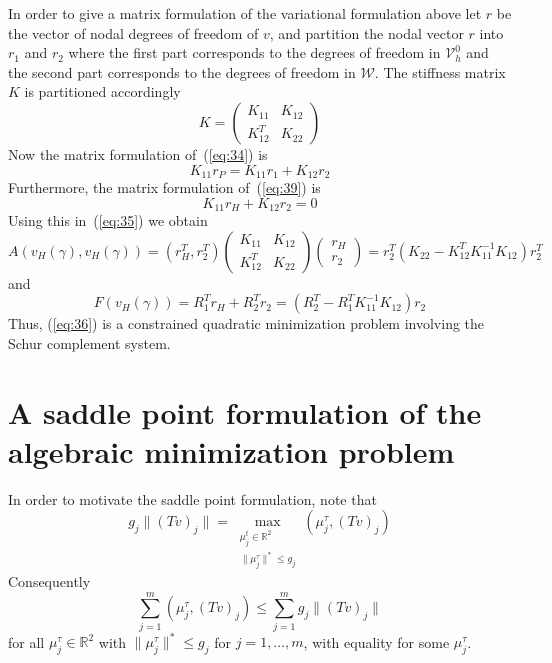 \documentclass[12pt,a4paper]{article}
\numberwithin{equation}{section}
\numberwithin{table}{section}
\numberwithin{figure}{section}
\newcommand{\R}{\ensuremath{\mathbb{R}}}
\newcommand{\W}{\ensuremath{\mathcal{W}}}
\newcommand{\Vh}{{\mathcal V}_h}
\providecommand{\norm}[1]{\lVert #1 \rVert}
\begin{document}
In order to give a matrix formulation of the variational formulation above let $r$ be the
vector of nodal degrees of freedom of $v$, and partition the nodal vector $r$ into $r_1$
and $r_2$ where the first part corresponds to the degrees of freedom in $\Vh^0$ and the
second part corresponds to the degrees of freedom in $\W$.  The stiffness matrix $K$ is
partitioned accordingly
\begin{equation}
  \label{eq:37}
  K = 
  \begin{pmatrix}
    K_{11} & K_{12} \\ K_{12}^T & K_{22}
  \end{pmatrix}
\end{equation}
Now the matrix formulation of~(\ref{eq:34}) is
\begin{equation}
  \label{eq:33}
  K_{11} r_P = K_{11} r_1 + K_{12} r_2
\end{equation}
Furthermore, the matrix formulation of~(\ref{eq:39}) is
\begin{equation}
  \label{eq:40}
  K_{11} r_H + K_{12} r_2 = 0
\end{equation}
Using this in~(\ref{eq:35}) we obtain
\begin{equation*}
  \label{eq:41}
  A(v_H(\gamma), v_H(\gamma)) = (r_H^T, r_2^T)
  \begin{pmatrix}
    K_{11} & K_{12} \\ K_{12}^T & K_{22}
  \end{pmatrix}
  \begin{pmatrix}
    r_H \\ r_2
  \end{pmatrix}
  = r_2^T ( K_{22} - K_{12}^T K_{11}^{-1} K_{12} ) r_2^T
\end{equation*}
and
\begin{equation*}
  F(v_H(\gamma)) = R_1^T r_H + R_2^T r_2 = (R_2^T - R_1^T K_{11}^{-1} K_{12} ) r_2
\end{equation*}
Thus, (\ref{eq:36}) is a constrained quadratic minimization problem involving the Schur
complement system.


\section{A saddle point formulation of the algebraic minimization problem}
\label{sec:saddle-point-form}

In order to motivate the saddle point formulation, note that
\begin{equation}
  \label{eq:13}
  g_j \norm{(Tv)_j}
  = \max_{\substack{\mu^t_j\in\R^2 \\ \norm{\mu^\tau_j}^*\le g_j}} (\mu^\tau_j, (Tv)_j)
\end{equation}
Consequently
\begin{equation}
  \label{eq:14}
  \sum_{j=1}^m (\mu^\tau_j, (Tv)_j) \le \sum_{j=1}^m g_j \norm{(Tv)_j}
\end{equation}
for all $\mu^\tau_j\in\R^2$ with $\norm{\mu^\tau_j}^*\le g_j$ for $j=1,\dotsc,m$, with equality
for some $\mu^\tau_j$.
\end{document}

